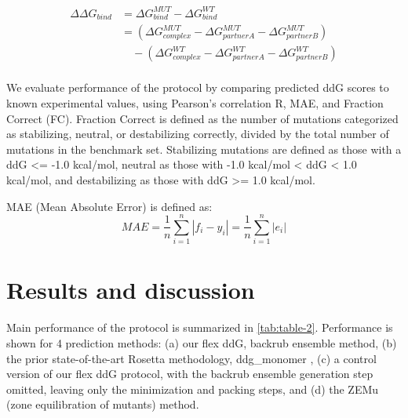 \begin{equation}\label{split-ddg-equation}
  \begin{split}
    {\Delta\Delta}G_{bind} & ={\Delta}G^{MUT}_{bind} - {\Delta}G^{WT}_{bind}\\
    & =({\Delta}G^{MUT}_{complex} - {\Delta}G^{MUT}_{partner A} - {\Delta}G^{MUT}_{partner B})\\
    & \quad - ({\Delta}G^{WT}_{complex} - {\Delta}G^{WT}_{partner A} - {\Delta}G^{WT}_{partner B})\\
  \end{split}
\end{equation}

We evaluate performance of the protocol by comparing predicted ddG scores to known experimental values, using Pearson’s correlation R, MAE, and Fraction Correct (FC). Fraction Correct is defined as the number of mutations categorized as stabilizing, neutral, or destabilizing correctly, divided by the total number of mutations in the benchmark set. Stabilizing mutations are defined as those with a ddG <= -1.0 kcal/mol, neutral as those with -1.0 kcal/mol < ddG < 1.0 kcal/mol, and destabilizing as those with ddG >= 1.0 kcal/mol.

MAE (Mean Absolute Error) is defined as:
\begin{equation}\label{MAE-equation}
  MAE = \dfrac{1}{n}\sum\limits_{i=1}^n|f_i-y_i| = \dfrac{1}{n}\sum\limits_{i=1}^n|e_i|
\end{equation}

\section{Results and discussion}

Main performance of the protocol is summarized in \ref{tab:table-2}. Performance is shown for 4 prediction methods: (a) our flex ddG, backrub ensemble method, (b) the prior state-of-the-art Rosetta methodology, ddg\_monomer \cite{Kellogg_role_ 2011}, (c) a control version of our flex ddG protocol, with the backrub ensemble generation step omitted, leaving only the minimization and packing steps, and (d) the ZEMu (zone equilibration of mutants) method\cite{dourado_multiscale_2014}.

